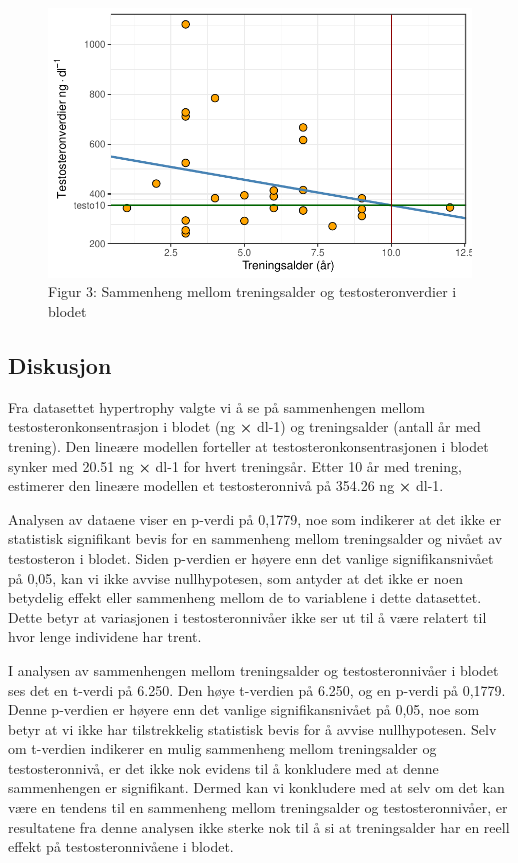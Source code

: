 \documentclass[
  letterpaper,
  DIV=11,
  numbers=noendperiod]{scrreprt}
\begin{document}
\begin{figure}[H]

{\centering \includegraphics{02-regression-models_files/figure-pdf/tolkning av regresjonsmodell-1.pdf}

}

\caption{Figur 3: Sammenheng mellom treningsalder og testosteronverdier
i blodet}

\end{figure}%

\subsection{Diskusjon}\label{diskusjon-3}

Fra datasettet hypertrophy valgte vi å se på sammenhengen mellom
testosteronkonsentrasjon i blodet (ng \textbf{×} dl-1) og treningsalder
(antall år med trening). Den lineære modellen forteller at
testosteronkonsentrasjonen i blodet synker med 20.51 ng \textbf{×} dl-1
for hvert treningsår. Etter 10 år med trening, estimerer den lineære
modellen et testosteronnivå på 354.26 ng \textbf{×} dl-1.

Analysen av dataene viser en p-verdi på 0,1779, noe som indikerer at det
ikke er statistisk signifikant bevis for en sammenheng mellom
treningsalder og nivået av testosteron i blodet. Siden p-verdien er
høyere enn det vanlige signifikansnivået på 0,05, kan vi ikke avvise
nullhypotesen, som antyder at det ikke er noen betydelig effekt eller
sammenheng mellom de to variablene i dette datasettet. Dette betyr at
variasjonen i testosteronnivåer ikke ser ut til å være relatert til hvor
lenge individene har trent.

I analysen av sammenhengen mellom treningsalder og testosteronnivåer i
blodet ses det en t-verdi på 6.250. Den høye t-verdien på 6.250, og en
p-verdi på 0,1779. Denne p-verdien er høyere enn det vanlige
signifikansnivået på 0,05, noe som betyr at vi ikke har tilstrekkelig
statistisk bevis for å avvise nullhypotesen. Selv om t-verdien indikerer
en mulig sammenheng mellom treningsalder og testosteronnivå, er det ikke
nok evidens til å konkludere med at denne sammenhengen er signifikant.
Dermed kan vi konkludere med at selv om det kan være en tendens til en
sammenheng mellom treningsalder og testosteronnivåer, er resultatene fra
denne analysen ikke sterke nok til å si at treningsalder har en reell
effekt på testosteronnivåene i blodet.
\end{document}

